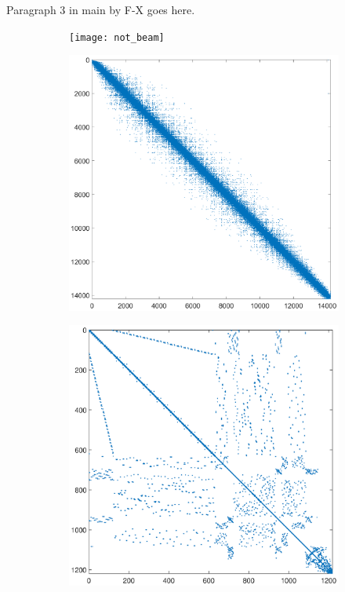 \documentclass{elsarticle}
\begin{document}
		Paragraph 3 in main by F-X goes here.
		\begin{figure}
			\centering
			\begin{subfigure}{0.3\textwidth}
				\texttt{[image: not\_beam]}
				\caption{}
				\label{fig:mat_beam}
			\end{subfigure}
			\enskip
			\begin{subfigure}{0.3\textwidth}
				\includegraphics[width=\textwidth,trim={410 40 400 40},clip]{2d_airfoil.eps}
				\caption{}
				\label{fig:mat_foil}
			\end{subfigure}
			\enskip
			\begin{subfigure}{0.3\textwidth}
				\includegraphics[width=\textwidth,trim={410 40 400 40},clip]{2d_fan.eps}

\end{subfigure}
\end{figure}
\end{document}
